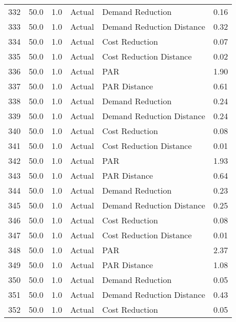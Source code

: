 \begin{longtable}{lrrllr}
332  &         50.0 &     1.0 &         Actual &           Demand Reduction &   0.16 \\
333  &         50.0 &     1.0 &         Actual &  Demand Reduction Distance &   0.32 \\
334  &         50.0 &     1.0 &         Actual &             Cost Reduction &   0.07 \\
335  &         50.0 &     1.0 &         Actual &    Cost Reduction Distance &   0.02 \\
336  &         50.0 &     1.0 &         Actual &                        PAR &   1.90 \\
337  &         50.0 &     1.0 &         Actual &               PAR Distance &   0.61 \\
338  &         50.0 &     1.0 &         Actual &           Demand Reduction &   0.24 \\
339  &         50.0 &     1.0 &         Actual &  Demand Reduction Distance &   0.24 \\
340  &         50.0 &     1.0 &         Actual &             Cost Reduction &   0.08 \\
341  &         50.0 &     1.0 &         Actual &    Cost Reduction Distance &   0.01 \\
342  &         50.0 &     1.0 &         Actual &                        PAR &   1.93 \\
343  &         50.0 &     1.0 &         Actual &               PAR Distance &   0.64 \\
344  &         50.0 &     1.0 &         Actual &           Demand Reduction &   0.23 \\
345  &         50.0 &     1.0 &         Actual &  Demand Reduction Distance &   0.25 \\
346  &         50.0 &     1.0 &         Actual &             Cost Reduction &   0.08 \\
347  &         50.0 &     1.0 &         Actual &    Cost Reduction Distance &   0.01 \\
348  &         50.0 &     1.0 &         Actual &                        PAR &   2.37 \\
349  &         50.0 &     1.0 &         Actual &               PAR Distance &   1.08 \\
350  &         50.0 &     1.0 &         Actual &           Demand Reduction &   0.05 \\
351  &         50.0 &     1.0 &         Actual &  Demand Reduction Distance &   0.43 \\
352  &         50.0 &     1.0 &         Actual &             Cost Reduction &   0.05 \\

\end{longtable}
